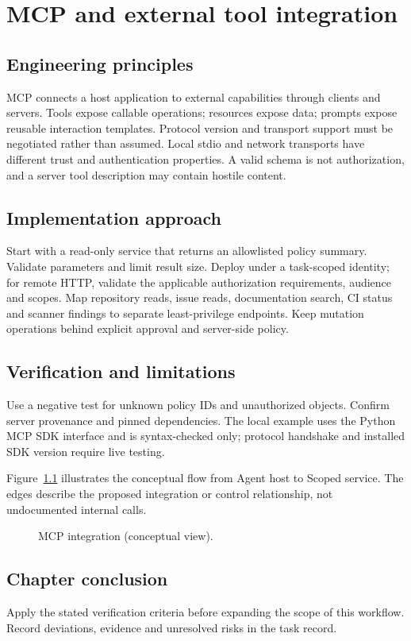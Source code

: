 \chapter{MCP and external tool integration}

\section{Engineering principles}

MCP connects a host application to external capabilities through clients and servers. Tools expose callable operations; resources expose data; prompts expose reusable interaction templates. Protocol version and transport support must be negotiated rather than assumed. Local stdio and network transports have different trust and authentication properties. A valid schema is not authorization, and a server tool description may contain hostile content.

\section{Implementation approach}

Start with a read-only service that returns an allowlisted policy summary. Validate parameters and limit result size. Deploy under a task-scoped identity; for remote HTTP, validate the applicable authorization requirements, audience and scopes. Map repository reads, issue reads, documentation search, CI status and scanner findings to separate least-privilege endpoints. Keep mutation operations behind explicit approval and server-side policy.

\section{Verification and limitations}

Use a negative test for unknown policy IDs and unauthorized objects. Confirm server provenance and pinned dependencies. The local example uses the Python MCP SDK interface and is syntax-checked only; protocol handshake and installed SDK version require live testing.

Figure~\ref{fig:d9} illustrates the conceptual flow from Agent host to Scoped service. The edges describe the proposed integration or control relationship, not undocumented internal calls.

\begin{figure}[htbp]\centering\caption{MCP integration (conceptual view).}\label{fig:d9}\end{figure}

\section{Chapter conclusion}

Apply the stated verification criteria before expanding the scope of this workflow. Record deviations, evidence and unresolved risks in the task record.
